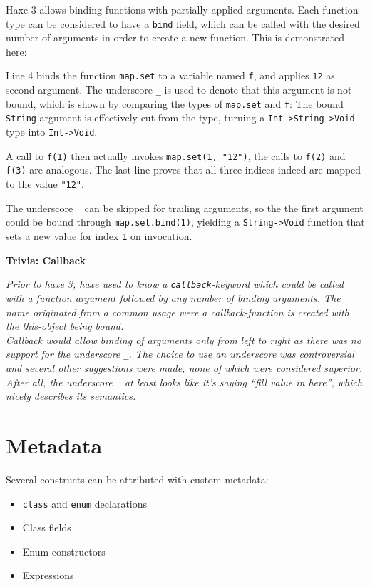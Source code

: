 \documentclass[a4paper,oneside]{book}
\newcommand{\type}[1]{\texttt{#1}}
\newcommand{\expr}[1]{\texttt{#1}}
\newenvironment{myshaded}
  {\def\FrameCommand{\fboxsep=\topsep\colorbox{bgcolor}}%
  \MakeFramed {\advance\hsize-\width \FrameRestore}}%
 {\endMakeFramed}
\newcommand{\trivia}[2]
	{\begin{myshaded}\noindent\textbf{Trivia: #1}\par\nobreak\noindent\ignorespaces\textit{#2}\end{myshaded}}
\newcommand{\haxe}[2][]{%
}
\begin{document}
Haxe 3 allows binding functions with partially applied arguments. Each function type can be considered to have a \expr{bind} field, which can be called with the desired number of arguments in order to create a new function. This is demonstrated here:

\haxe{assets/Bind.hx}
Line 4 binds the function \expr{map.set} to a variable named \expr{f}, and applies \expr{12} as second argument. The underscore \expr{_} is used to denote that this argument is not bound, which is shown by comparing the types of \expr{map.set} and \expr{f}: The bound \type{String} argument is effectively cut from the type, turning a \expr{Int->String->Void} type into \expr{Int->Void}.

A call to \expr{f(1)} then actually invokes \expr{map.set(1, "12")}, the calls to \expr{f(2)} and \expr{f(3)} are analogous. The last line proves that all three indices indeed are mapped to the value \expr{"12"}.

The underscore \expr{_} can be skipped for trailing arguments, so the the first argument could be bound through \expr{map.set.bind(1)}, yielding a \expr{String->Void} function that sets a new value for index \expr{1} on invocation.

\trivia{Callback}{Prior to haxe 3, haxe used to know a \expr{callback}-keyword which could be called with a function argument followed by any number of binding arguments. The name originated from a common usage were a callback-function is created with the this-object being bound.\\
Callback would allow binding of arguments only from left to right as there was no support for the underscore \expr{_}. The choice to use an underscore was controversial and several other suggestions were made, none of which were considered superior. After all, the underscore \expr{_} at least looks like it's saying ``fill value in here'', which nicely describes its semantics.}



\section{Metadata}
\label{lf-metadata}

Several constructs can be attributed with custom metadata:

\begin{itemize}
	\item \expr{class} and \expr{enum} declarations
	\item Class fields
	\item Enum constructors
	\item Expressions
\end{itemize}
\end{document}
